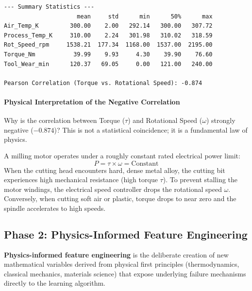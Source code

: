 \begin{lstlisting}[style=outputstyle]
--- Summary Statistics ---
                     mean     std      min      50%      max
Air_Temp_K         300.00    2.00   292.14   300.00   307.72
Process_Temp_K     310.00    2.24   301.98   310.02   318.59
Rot_Speed_rpm     1538.21  177.34  1168.00  1537.00  2195.00
Torque_Nm           39.99    9.93     4.30    39.90    76.60
Tool_Wear_min      120.37   69.05     0.00   121.00   240.00

Pearson Correlation (Torque vs. Rotational Speed): -0.874
\end{lstlisting}

\paragraph{Physical Interpretation of the Negative Correlation}
Why is the correlation between Torque ($\tau$) and Rotational Speed ($\omega$) strongly negative ($-0.874$)? This is not a statistical coincidence; it is a fundamental law of physics. 

A milling motor operates under a roughly constant rated electrical power limit:
\begin{equation}
P = \tau \times \omega = \text{Constant}\label{eq:power_conservation}
\end{equation}
When the cutting head encounters hard, dense metal alloy, the cutting bit experiences high mechanical resistance (high torque $\tau$). To prevent stalling the motor windings, the electrical speed controller drops the rotational speed $\omega$. Conversely, when cutting soft air or plastic, torque drops to near zero and the spindle accelerates to high speeds. 

\subsection{Phase 2: Physics-Informed Feature Engineering}

\begin{keyidea}
\textbf{Physics-informed feature engineering} is the deliberate creation of new mathematical variables derived from physical first principles (thermodynamics, classical mechanics, materials science) that expose underlying failure mechanisms directly to the learning algorithm.
\end{keyidea}

